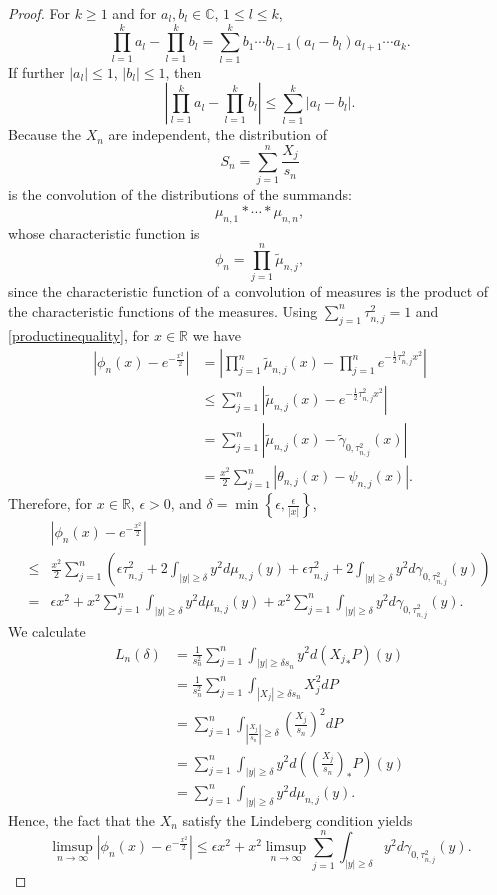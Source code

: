 \documentclass{article}
\theoremstyle{definition}
\begin{document}
\begin{proof}
For $k \geq 1$ and for $a_l,b_l \in \mathbb{C}$, $1 \leq l \leq k$,
\[
\prod_{l=1}^k a_l - \prod_{l=1}^k b_l= \sum_{l=1}^k b_1 \cdots b_{l-1} (a_l-b_l) a_{l+1} \cdots a_k.
\]
If further $|a_l| \leq 1$, $|b_l| \leq 1$, then
\begin{equation}
\left|\prod_{l=1}^k a_l - \prod_{l=1}^k b_l \right| \leq \sum_{l=1}^k |a_l-b_l|.
\label{productinequality}
\end{equation}
Because the $X_n$ are independent, the distribution of
\[
S_n = \sum_{j=1}^n \frac{X_j}{s_n}
\]
is the convolution of the distributions of the summands:
\[
\mu_{n,1} * \cdots * \mu_{n,n},
\]
whose characteristic function is
\[
\phi_n= \prod_{j=1}^n \tilde{\mu}_{n,j},
\]
since the characteristic function of a convolution of measures is the product of the characteristic functions
of the measures.
Using
$\sum_{j=1}^n \tau_{n,j}^2=1$ and \eqref{productinequality}, for $x \in \mathbb{R}$ we have
\begin{align*}
|\phi_n(x)-e^{-\frac{x^2}{2}}|&=\left| \prod_{j=1}^n \tilde{\mu}_{n,j}(x) - \prod_{j=1}^n e^{-\frac{1}{2} \tau_{n,j}^2 x^2}\right|\\
&\leq \sum_{j=1}^n \left|\tilde{\mu}_{n,j}(x) - e^{-\frac{1}{2} \tau_{n,j}^2 x^2}\right|\\
&=\sum_{j=1}^n \left|\tilde{\mu}_{n,j}(x) -  \tilde{\gamma}_{0,\tau_{n,j}^2}(x)\right|\\
&= \frac{x^2}{2} \sum_{j=1}^n \left|\theta_{n,j}(x)- \psi_{n,j}(x) \right|.
\end{align*} 
Therefore, for $x \in \mathbb{R}$, $\epsilon>0$, and 
$\delta = \min\left\{\epsilon,\frac{\epsilon}{|x|} \right\}$, 
\[
\begin{split}
&|\phi_n(x)-e^{-\frac{x^2}{2}}|\\
\leq&\frac{x^2}{2} \sum_{j=1}^n 
\left(\epsilon \tau_{n,j}^2 + 2 \int_{|y| \geq \delta} y^2 d\mu_{n,j}(y)
+\epsilon \tau_{n,j}^2+2\int_{|y| \geq \delta} y^2 d\gamma_{0,\tau_{n,j}^2}(y)\right)\\
=&\epsilon x^2 +x^2 \sum_{j=1}^n  \int_{|y| \geq \delta} y^2 d\mu_{n,j}(y)
+x^2 \sum_{j=1}^n \int_{|y| \geq \delta} y^2 d\gamma_{0,\tau_{n,j}^2}(y).
\end{split}
\]
We calculate
\begin{align*}
L_n(\delta)& = \frac{1}{s_n^2} \sum_{j=1}^n \int_{|y| \geq \delta s_n} y^2 d({X_j}_*P)(y)\\
&=\frac{1}{s_n^2} \sum_{j=1}^n \int_{|X_j| \geq \delta s_n} X_j^2 dP\\
&= \sum_{j=1}^n \int_{\left| \frac{X_j}{s_n}  \right|  \geq \delta} \left( \frac{X_j}{s_n} \right)^2 dP\\
&=\sum_{j=1}^n \int_{|y| \geq \delta} y^2 d\left(\left( \frac{X_j}{s_n} \right)_*P\right)(y)\\
&=\sum_{j=1}^n \int_{|y| \geq \delta} y^2 d\mu_{n,j}(y).
\end{align*}
Hence, the fact that the $X_n$ satisfy the Lindeberg condition yields
\begin{equation}
\limsup_{n \to \infty} |\phi_n(x)-e^{-\frac{x^2}{2}}| \leq \epsilon x^2 + x^2 \limsup_{n \to \infty}  \sum_{j=1}^n \int_{|y| \geq \delta} y^2 d\gamma_{0,\tau_{n,j}^2}(y).
\label{limsup1}
\end{equation}


\end{proof}
\end{document}
